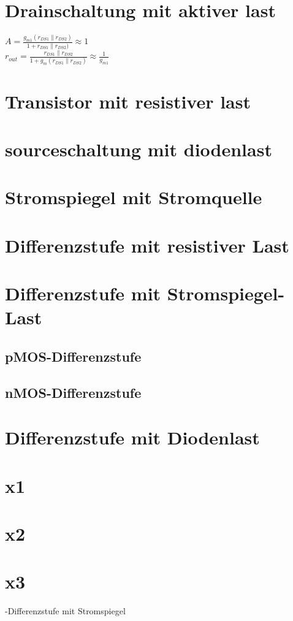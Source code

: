 \documentclass[european]{latex4ei_sheet}
\begin{document}
\section{Drainschaltung mit aktiver last}
$A = \frac{g_{m1}(r_{DS1}\parallel r_{DS2})}{1+r_{DS1}\parallel r_{DS2})} \approx 1$\\
$r_{out}=\frac{r_{DS1}\parallel r_{DS2}}{1+g_m(r_{DS1}\parallel r_{DS2})} \approx \frac{1}{g_{m1}}$

\section{Transistor mit resistiver last}
\section{sourceschaltung mit diodenlast}

\section{Stromspiegel mit Stromquelle}

\section{Differenzstufe mit resistiver Last}

\section{Differenzstufe mit Stromspiegel-Last}
	\subsection{pMOS-Differenzstufe}
	
	\subsection{nMOS-Differenzstufe}

\section{Differenzstufe mit Diodenlast}

\section{x1}

\section{x2}

\section{x3}

-Differenzstufe mit Stromspiegel





\end{document}
